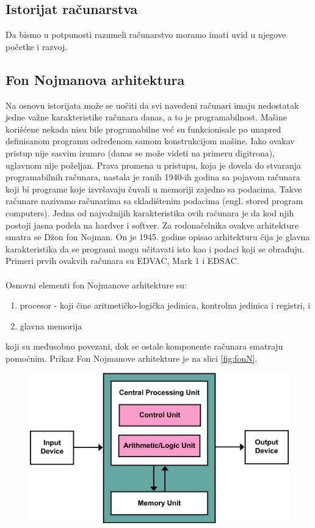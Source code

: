 \documentclass[a4paper]{article}
\begin{document}
{\subsection{Istorijat računarstva}
Da bismo u potpunosti razumeli računarstvo moramo imati uvid u njegove početke i razvoj.
 
\subsection{Fon Nojmanova arhitektura}
Na osnovu istorijata može se uočiti da svi navedeni računari imaju nedostatak jedne važne karakteristike računara danas, a to je programabilnost. Mašine korišćene nekada nisu bile programabilne već su funkcionisale po unapred definisanom programu određenom samom konstrukcijom mašine. Iako ovakav pristup nije sasvim izumro (danas se može videti na primeru digitrona), uglavnom nije poželjan. Prava promena u pristupu, koja je dovela do stvaranja programabilnih računara, nastala je ranih 1940-ih godina sa pojavom računara koji bi programe koje izvršavaju čuvali u memoriji zajedno sa podacima. Takve računare nazivamo računarima sa skladištenim podacima (engl. stored program computers). Jedna od najvažnijih karakteristika ovih računara je da kod njih postoji jasna podela na hardver i softver. Za rodonačelnika ovakve arhitekture smatra se Džon fon Nojman. On je 1945. godine opisao arhitekturu čija je glavna karakteristika da se programi mogu učitavati isto kao i podaci koji se obrađuju. Primeri prvih ovakvih računara su EDVAC, Mark 1 i EDSAC.\\\\
Osnovni elementi fon Nojmanove arhitekture su:
\begin{enumerate}
\item procesor - koji čine aritmetičko-logička jedinica, kontrolna jedinica i registri, i 
\item glavna memorija 
\end{enumerate}
koji su međusobno povezani, dok se ostale komponente računara smatraju pomoćnim. Prikaz Fon Nojmanove arhitekture je na slici \ref{fig:fonN}.
\begin{figure}[h!]
\begin{center}
\includegraphics[scale=0.25]{pictures/fonN.png}

\end{center}
\end{figure}}
\end{document}
